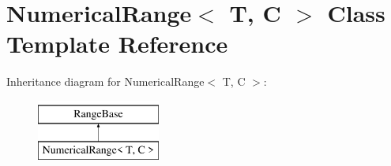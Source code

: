\hypertarget{classNumericalRange}{}\section{Numerical\+Range$<$ T, C $>$ Class Template Reference}
\label{classNumericalRange}
Inheritance diagram for Numerical\+Range$<$ T, C $>$\+:\begin{figure}[H]
\begin{center}
\leavevmode
\includegraphics[height=2.000000cm]{classNumericalRange}
\end{center}
\end{figure}
